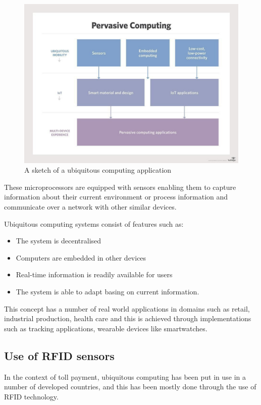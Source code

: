 \begin{figure}
    \begin{center}
        \includegraphics[scale = 0.3]{images/ubq}
        \caption{A sketch of a ubiquitous computing application}
    \end{center}
\end{figure}
These microprocessors are equipped with sensors enabling them to capture information about their current environment or process information and communicate over a network with other similar devices\cite{friedewald_ubiquitous_2011}.

Ubiquitous computing systems consist of features such as:\cite{friedewald_ubiquitous_2011}
\begin{itemize}
    \item The system is decentralised
    \item Computers are embedded in other devices
    \item Real-time information is readily available for users
    \item The system is able to adapt basing on current information.
\end{itemize}

This concept has a number of real world applications in domains such as retail, industrial production, health care and this is achieved through implementations such as tracking applications, wearable devices like smartwatches.

\subsection{Use of RFID sensors}
In the context of toll payment, ubiquitous computing has been put in use in a number of developed countries, and this has been mostly done through the use of RFID technology.

